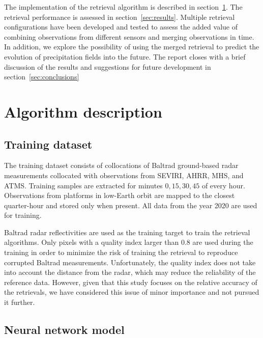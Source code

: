 \documentclass[11pt]{scrartcl}
\begin{document}
The implementation of the retrieval algorithm is described in
section~\ref{sec:method}. The retrieval performance is assessed in
section~\ref{sec:results}. Multiple retrieval configurations have been developed
and tested to assess the added value of combining observations from different
sensors and merging observations in time. In addition, we explore the
possibility of using the merged retrieval to predict the evolution of
precipitation fields into the future. The report closes with a brief
discussion of the results and suggestions for future development in
section~\ref{sec:conclusions}


\section{Algorithm description}
\label{sec:method}


\subsection{Training dataset}
\label{sec:org4dcfa76}

The training dataset consists of collocations of Baltrad ground-based
 radar measurements collocated with observations from SEVIRI, AHRR,
MHS, and ATMS. Training samples are extracted for minutes \(0, 15, 30, 45\) of
every hour. Observations from platforms in low-Earth orbit are mapped to the
closest quarter-hour and stored only when present. All data from the year 2020
are used for training.


Baltrad radar reflectivities are used as the training target to train the retrieval algorithms. Only pixels with a quality index larger than 0.8 are used during the training in order to minimize the risk of training the retrieval to reproduce corrupted Baltrad measurements. Unfortunately, the quality index does not take into account the distance from the radar, which may reduce the reliability of the reference data. However, given that this study focuses on the relative accuracy of the retrievals, we have considered this issue of minor importance and not pursued it further.

\subsection{Neural network model}
\label{sec:org623391a}
\end{document}
